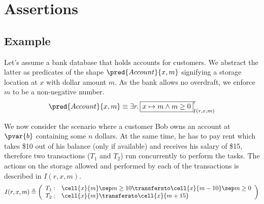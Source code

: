 \section{Assertions}

\subsection{Example}

Let's assume a bank database that holds accounts for customers. We abstract the latter as predicates of the shape $\pred{Account}{x, m}$ signifying a storage location at $x$ with dollar amount $m$. As the bank allows no overdraft, we enforce $m$ to be a non-negative number.
\[
\pred{Account}{x, m} \equiv \exists r \ldotp \boxed{x \mapsto m \land m \geq 0}^r_{I(r, x, m)}
\]

We now consider the scenario where a customer Bob owns an account at $\pvar{b}$ containing some $n$ dollars. At the same time, he has to pay rent which takes \$10 out of his balance (only if available) and receives his salary of \$15, therefore two transactions ($T_1$ and $T_2$) run concurrently to perform the tasks. The actions on the storage allowed and performed by each of the transactions is described in $I(r, x, m)$.
\[
I(r, x, m) \triangleq \left( 
\begin{array}{r l}
T_1: & \cell{x}{m} \sep m \geq 10 \transfersto \cell{x}{m - 10} \sep m \geq 0 \\
T_2: & \cell{x}{m} \transfersto \cell{x}{m + 15}
\end{array}
 \right)
\]

